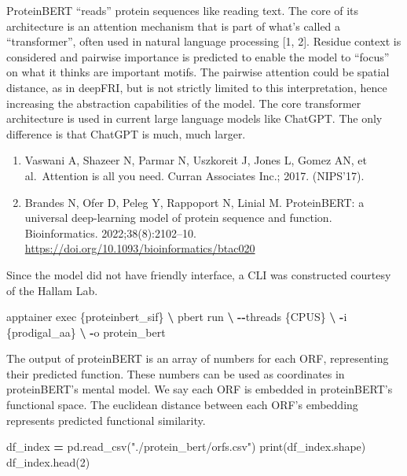 \documentclass[
]{book}
\newenvironment{Shaded}{\begin{snugshade}}{\end{snugshade}}
\newcommand{\BuiltInTok}[1]{#1}
\newcommand{\DecValTok}[1]{\textcolor[rgb]{0.00,0.00,0.81}{#1}}
\newcommand{\NormalTok}[1]{#1}
\newcommand{\OperatorTok}[1]{\textcolor[rgb]{0.81,0.36,0.00}{\textbf{#1}}}
\newcommand{\StringTok}[1]{\textcolor[rgb]{0.31,0.60,0.02}{#1}}
\providecommand{\tightlist}{%
  \setlength{\itemsep}{0pt}\setlength{\parskip}{0pt}}
\begin{document}
ProteinBERT ``reads'' protein sequences like reading text. The core of its architecture is an attention mechanism that is
part of what's called a ``transformer'', often used in natural language processing {[}1, 2{]}. Residue context is considered and pairwise
importance is predicted to enable the model to ``focus'' on what it thinks are important motifs. The pairwise attention could be
spatial distance, as in deepFRI, but is not strictly limited to this interpretation, hence increasing the abstraction capabilities
of the model. The core transformer architecture is used in current large language models like ChatGPT. The only difference is that
ChatGPT is much, much larger.

\begin{enumerate}
\def\labelenumi{\arabic{enumi}.}
\tightlist
\item
  Vaswani A, Shazeer N, Parmar N, Uszkoreit J, Jones L, Gomez AN, et al.~Attention is all you need. Curran Associates Inc.; 2017. (NIPS'17).
\item
  Brandes N, Ofer D, Peleg Y, Rappoport N, Linial M. ProteinBERT: a universal deep-learning model of protein sequence and function. Bioinformatics. 2022;38(8):2102--10. \url{https://doi.org/10.1093/bioinformatics/btac020}
\end{enumerate}

Since the model did not have friendly interface, a CLI was constructed courtesy of the Hallam Lab.

\begin{Shaded}
\begin{Highlighting}[numbers=left,,]
\NormalTok{apptainer }\BuiltInTok{exec}\NormalTok{ \{proteinbert\_sif\} }\OperatorTok{\textbackslash{}}
\NormalTok{    pbert run }\OperatorTok{\textbackslash{}}
        \OperatorTok{{-}{-}}\NormalTok{threads \{CPUS\} }\OperatorTok{\textbackslash{}}
        \OperatorTok{{-}}\NormalTok{i \{prodigal\_aa\} }\OperatorTok{\textbackslash{}}
        \OperatorTok{{-}}\NormalTok{o protein\_bert}
\end{Highlighting}
\end{Shaded}

The output of proteinBERT is an array of numbers for each ORF, representing their predicted function.
These numbers can be used as coordinates in proteinBERT's mental model.
We say each ORF is embedded in proteinBERT's functional space. The euclidean distance between each ORF's
embedding represents predicted functional similarity.

\begin{Shaded}
\begin{Highlighting}[numbers=left,,]
\NormalTok{df\_index }\OperatorTok{=}\NormalTok{ pd.read\_csv(}\StringTok{"./protein\_bert/orfs.csv"}\NormalTok{)}
\BuiltInTok{print}\NormalTok{(df\_index.shape)}
\NormalTok{df\_index.head(}\DecValTok{2}\NormalTok{)}
\end{Highlighting}
\end{Shaded}
\end{document}
